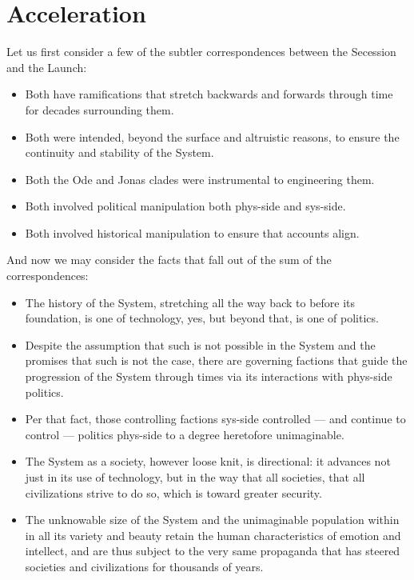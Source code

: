\documentclass[10pt]{memoir}
\begin{document}
	\cleartoverso
  \part{Acceleration}
  Let us first consider a few of the subtler correspondences between the Secession and the Launch:
  
  \begin{itemize}
  \item Both have ramifications that stretch backwards and forwards through time for decades surrounding them.
  \item Both were intended, beyond the surface and altruistic reasons, to ensure the continuity and stability of the System.
  \item Both the Ode and Jonas clades were instrumental to engineering them.
  \item Both involved political manipulation both phys-side and sys-side.
  \item Both involved historical manipulation to ensure that accounts align.
  \end{itemize}
 
  And now we may consider the facts that fall out of the sum of the correspondences:
 
  \begin{itemize}
  \item The history of the System, stretching all the way back to before its foundation, is one of technology, yes, but beyond that, is one of politics.
  \item Despite the assumption that such is not possible in the System and the promises that such is not the case, there are governing factions that guide the progression of the System through times via its interactions with phys-side politics.
  \item Per that fact, those controlling factions sys-side controlled --- and continue to control --- politics phys-side to a degree heretofore unimaginable.
  \item The System as a society, however loose knit, is directional: it advances not just in its use of technology, but in the way that all societies, that all civilizations strive to do so, which is toward greater security.
  \item The unknowable size of the System and the unimaginable population within in all its variety and beauty retain the human characteristics of emotion and intellect, and are thus subject to the very same propaganda that has steered societies and civilizations for thousands of years.
  \end{itemize}
\end{document}
